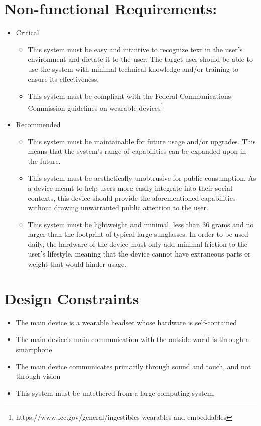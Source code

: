\pagebreak

\section{Non-functional Requirements:}
\begin{itemize}
\item Critical
	\begin{itemize}
	\item This system must be easy and intuitive to recognize text in the user's environment and dictate it to the user. The target user should be able to use the system with minimal technical knowledge and/or training to ensure its effectiveness.
	\item This system must be compliant with the Federal Communications Commission guidelines on wearable devices\footnote{https://www.fcc.gov/general/ingestibles-wearables-and-embeddables}
    \end{itemize}
\item Recommended
	\begin{itemize}
	\item This system must be maintainable for future usage and/or upgrades. This means that the system's range of capabilities can be expanded upon in the future.
	\item This system must be aesthetically unobtrusive for public consumption. As a device meant to help users more easily integrate into their social contexts, this device should provide the aforementioned capabilities without drawing unwarranted public attention to the user.
	\item This system must be lightweight and minimal, less than 36 grams and no larger than the footprint of typical large sunglasses. In order to be used daily, the hardware of the device must only add minimal friction to the user's lifestyle, meaning that the device cannot have extraneous parts or weight that would hinder usage.
	\end{itemize}
\end{itemize}

\section{Design Constraints}
\begin{itemize}
\item The main device is a wearable headset whose hardware is self-contained
\item The main device's main communication with the outside world is through a smartphone
\item The main device communicates primarily through sound and touch, and not through vision
\item This system must be untethered from a large computing system.
\end{itemize}
